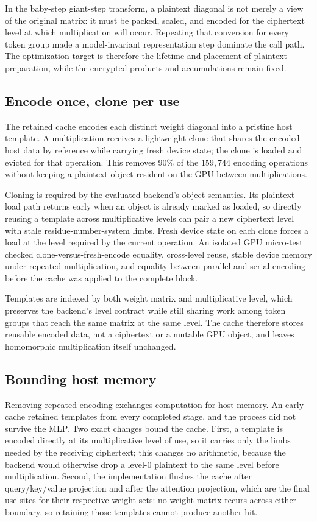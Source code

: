In the baby-step giant-step transform, a plaintext diagonal is not merely a view of the original
matrix: it must be packed, scaled, and encoded for the ciphertext level at which multiplication will
occur. Repeating that conversion for every token group made a model-invariant representation step
dominate the call path. The optimization target is therefore the lifetime and placement of plaintext
preparation, while the encrypted products and accumulations remain fixed.

\subsection{Encode once, clone per use}
The retained cache encodes each distinct weight diagonal into a pristine host template. A
multiplication receives a lightweight clone that shares the encoded host data by reference while
carrying fresh device state; the clone is loaded and evicted for that operation. This removes
$90\%$ of the $159{,}744$ encoding operations without keeping a plaintext object resident on the
GPU between multiplications.

Cloning is required by the evaluated backend's object semantics. Its plaintext-load path returns
early when an object is already marked as loaded, so directly reusing a template across
multiplicative levels can pair a new ciphertext level with stale residue-number-system limbs.
Fresh device state on each clone forces a load at the level required by the current operation. An
isolated GPU micro-test checked clone-versus-fresh-encode equality, cross-level reuse, stable device
memory under repeated multiplication, and equality between parallel and serial encoding before the
cache was applied to the complete block.

Templates are indexed by both weight matrix and multiplicative level, which preserves the backend's
level contract while still sharing work among token groups that reach the same matrix at the same
level. The cache therefore stores reusable encoded data, not a ciphertext or a mutable GPU object,
and leaves homomorphic multiplication itself unchanged.

\subsection{Bounding host memory}
Removing repeated encoding exchanges computation for host memory. An early cache retained
templates from every completed stage, and the process did not survive the MLP. Two exact changes
bound the cache. First, a template is encoded directly at its multiplicative level of use, so it
carries only the limbs needed by the receiving ciphertext; this changes no arithmetic, because the
backend would otherwise drop a level-$0$ plaintext to the same level before multiplication. Second,
the implementation flushes the cache after query/key/value projection and after the attention
projection, which are the final use sites for their respective weight sets: no weight matrix recurs
across either boundary, so retaining those templates cannot produce another hit.

